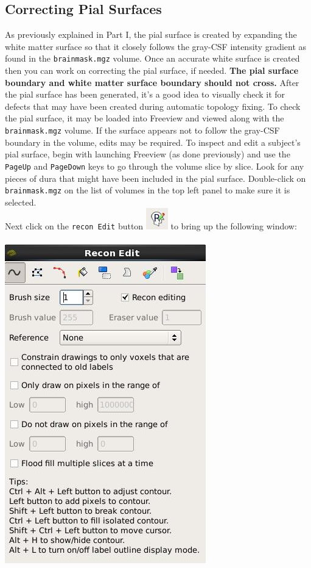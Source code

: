\documentclass[paper=a4, fontsize=11pt]{scrartcl} %
\numberwithin{equation}{section} %
\numberwithin{figure}{section} %
\numberwithin{table}{section} %
\begin{document}
\subsection{Correcting Pial Surfaces}\label{ss:pse}
As previously explained in Part I, the pial surface is created by expanding the white matter surface so that it closely follows the gray-CSF intensity gradient as found in the \texttt{brainmask.mgz} volume. Once an accurate white surface is created then you can work on correcting the pial surface, if needed. \textbf{The pial surface boundary and white matter surface boundary should not cross.} After the pial surface has been generated, it's a good idea to visually check it for defects that may have been created during automatic topology fixing. To check the pial surface, it may be loaded into Freeview and viewed along with the \texttt{brainmask.mgz} volume. If the surface appears not to follow the gray-CSF boundary in the volume, edits may be required. To inspect and edit a subject's pial surface, begin with launching Freeview (as done previously) and use the \texttt{PageUp} and \texttt{PageDown} keys to go through the volume slice by slice.  Look for any pieces of dura that might have been included in the pial surface.  Double-click on \texttt{brainmask.mgz} on the list of volumes in the top left panel to make sure it is selected.  ~\\ Next click on the \texttt{recon Edit} button 
\includegraphics{reconedit.jpg}
to bring up the following window: ~\\~\\
\includegraphics[scale=0.6]{reconeditingwindow.jpg} 
\end{document}
